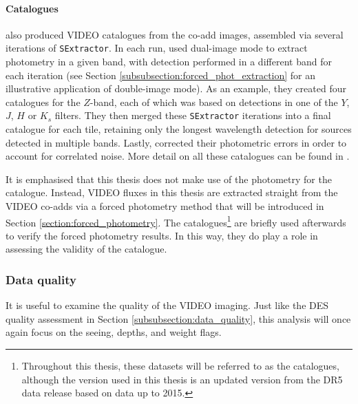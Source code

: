 \paragraph{Catalogues}
\cite{2013MNRAS.428.1281J} also produced VIDEO catalogues from the co-add images, assembled via several iterations of \texttt{SExtractor}. In each run, \cite{2013MNRAS.428.1281J} used dual-image mode to extract photometry in a given band, with detection performed in a different band for each iteration (see Section \ref{subsubsection:forced_phot_extraction} for an illustrative application of double-image mode). As an example, they created four catalogues for the $Z$-band, each of which was based on detections in one of the $Y$, $J$, $H$ or $K_{s}$ filters. They then merged these \texttt{SExtractor} iterations into a final catalogue for each tile, retaining only the longest wavelength detection for sources detected in multiple bands. Lastly, \cite{2013MNRAS.428.1281J} corrected their photometric errors in order to account for correlated noise. More detail on all these catalogues can be found in \cite{2013MNRAS.428.1281J}. \par 

It is emphasised that this thesis does not make use of the \cite{2013MNRAS.428.1281J} photometry for the \DESVIDEO catalogue. Instead, VIDEO fluxes in this thesis are extracted straight from the VIDEO co-adds via a forced photometry method that will be introduced in Section \ref{section:forced_photometry}. The \cite{2013MNRAS.428.1281J} catalogues\footnote{Throughout this thesis, these datasets will be referred to as the \cite{2013MNRAS.428.1281J} catalogues, although the version used in this thesis is an updated version from the DR5 data release based on data up to 2015.} are briefly used afterwards to verify the forced photometry results. In this way, they do play a role in assessing the validity of the \DESVIDEO catalogue. \par 



\subsubsection{Data quality}\label{subsubsection:data_quality_video}
It is useful to examine the quality of the VIDEO imaging. Just like the DES quality assessment in Section \ref{subsubsection:data_quality}, this analysis will once again focus on the seeing, depths, and weight flags. \par


